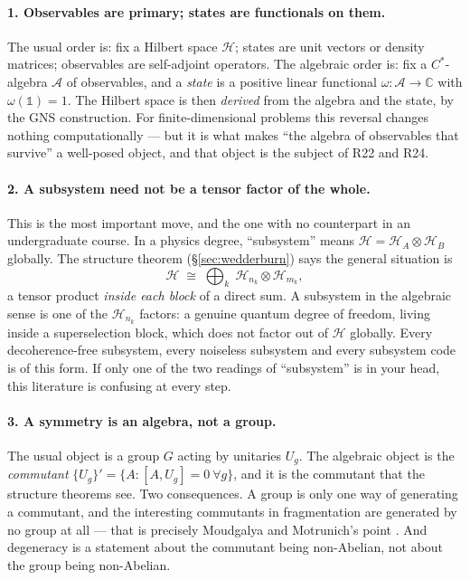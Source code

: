 \documentclass[11pt]{article}
\newcommand{\A}{\mathcal{A}}
\newcommand{\HH}{\mathcal{H}}
\theoremstyle{plain}
\theoremstyle{remark}
\begin{document}
\paragraph{1. Observables are primary; states are functionals on them.}
The usual order is: fix a Hilbert space $\HH$; states are unit vectors or
density matrices; observables are self-adjoint operators. The algebraic order
is: fix a $C^*$-algebra $\A$ of observables, and a \emph{state} is a positive
linear functional $\omega : \A \to \mathbb{C}$ with $\omega(\mathbb{1}) = 1$.
The Hilbert space is then \emph{derived} from the algebra and the state, by the
GNS construction. For finite-dimensional problems this reversal changes nothing
computationally --- but it is what makes ``the algebra of observables that
survive'' a well-posed object, and that object is the subject of R22 and R24.

\paragraph{2. A subsystem need not be a tensor factor of the whole.}
This is the most important move, and the one with no counterpart in an
undergraduate course. In a physics degree, ``subsystem'' means
$\HH = \HH_A \otimes \HH_B$ globally. The structure theorem
(\S\ref{sec:wedderburn}) says the general situation is
\[
  \HH \;\cong\; \bigoplus_k \; \HH_{n_k} \otimes \HH_{m_k},
\]
a tensor product \emph{inside each block} of a direct sum. A subsystem in the
algebraic sense is one of the $\HH_{n_k}$ factors: a genuine quantum degree of
freedom, living inside a superselection block, which does not factor out of
$\HH$ globally. Every decoherence-free subsystem, every noiseless subsystem and
every subsystem code \cite{KLP2005} is of this form. If only one of the two
readings of ``subsystem'' is in your head, this literature is confusing at
every step.

\paragraph{3. A symmetry is an algebra, not a group.}
The usual object is a group $G$ acting by unitaries $U_g$. The algebraic object
is the \emph{commutant} $\{U_g\}' = \{A : [A, U_g] = 0\ \forall g\}$, and it is
the commutant that the structure theorems see. Two consequences. A group is
only one way of generating a commutant, and the interesting commutants in
fragmentation are generated by no group at all --- that is precisely Moudgalya
and Motrunich's point \cite{MM2022}. And degeneracy is a statement about the
commutant being non-Abelian, not about the group being non-Abelian.
\end{document}
